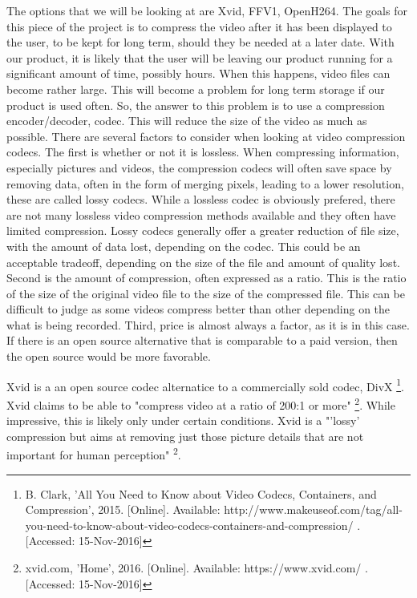 \documentclass[letterpaper,10pt,onecolumn,draftclsnofoot]{IEEEtran}
\begin{document}
The options that we will be looking at are Xvid, FFV1, OpenH264.
The goals for this piece of the project is to compress the video after it has been displayed to the user, to be kept for long term, should they be needed at a later date.
With our product, it is likely that the user will be leaving our product running for a significant amount of time, possibly hours.
When this happens, video files can become rather large.
This will become a problem for long term storage if our product is used often.
So, the answer to this problem is to use a compression encoder/decoder, codec.
This will reduce the size of the video as much as possible.
There are several factors to consider when looking at video compression codecs.
The first is whether or not it is lossless.
When compressing information, especially pictures and videos, the compression codecs will often save space by removing data, often in the form of merging pixels, leading to a lower resolution, these are called lossy codecs.
While a lossless codec is obviously prefered, there are not many lossless video compression methods available and they often have limited compression.
Lossy codecs generally offer a greater reduction of file size, with the amount of data lost, depending on the codec.
This could be an acceptable tradeoff, depending on the size of the file and amount of quality lost.
Second is the amount of compression, often expressed as a ratio.
This is the ratio of the size of the original video file to the size of the compressed file.
This can be difficult to judge as some videos compress better than other depending on the what is being recorded.
Third, price is almost always a factor, as it is in this case.
If there is an open source alternative that is comparable to a paid version, then the open source would be more favorable.

Xvid is a an open source codec alternatice to a commercially sold codec, DivX \footnote{B. Clark, 'All You Need to Know about Video Codecs, Containers, and Compression', 2015. [Online]. Available: http://www.makeuseof.com/tag/all-you-need-to-know-about-video-codecs-containers-and-compression/ . [Accessed: 15-Nov-2016] }. %
Xvid claims to be able to "compress video at a ratio of 200:1 or more" \footnote{xvid.com, 'Home', 2016. [Online]. Available: https://www.xvid.com/ . [Accessed: 15-Nov-2016] }. %
While impressive, this is likely only under certain conditions.
Xvid is a "'lossy' compression but aims at removing just those picture details that are not important for human perception" \textsuperscript{2}. %
\end{document}
